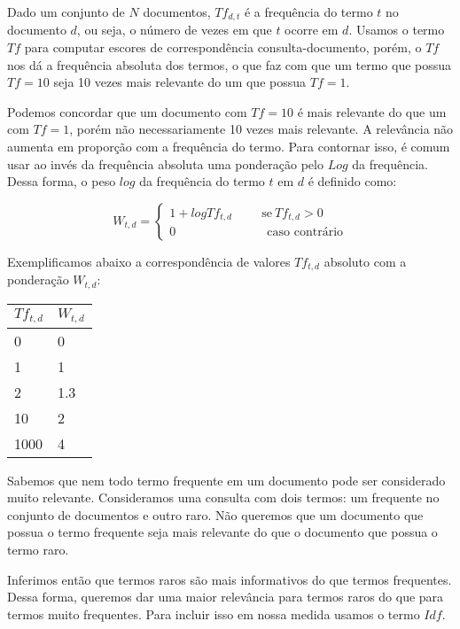 \documentclass[a4paper,12pt]{article}
\begin{document}
  Dado um conjunto de $N$ documentos, $Tf_{d,t}$ é a frequência do termo $t$ no documento
  $d$, ou seja, o número de vezes em que $t$ ocorre em $d$. Usamos o termo $Tf$ para computar escores de correspondência consulta-documento,
  porém, o $Tf$ nos dá a frequência absoluta dos termos, o que faz com que um termo que possua $Tf=10$ seja 10 vezes mais relevante do um que possua
  $Tf=1$. 
  
  Podemos concordar que um documento com $Tf=10$ é mais relevante do que um com $Tf=1$, porém não necessariamente 10 vezes mais relevante.
  A relevância não aumenta em proporção com a frequência do termo. Para contornar isso, é comum usar ao invés da frequência absoluta uma ponderação
  pelo $Log$ da frequência. Dessa forma, o peso $log$ da frequência do termo $t$ em $d$ é definido como:
  
  $$W_{t,d}=\begin{cases}
             1 + logTf_{t,d}  \hspace{1cm} \text{se} \ Tf_{t,d} > 0 \\
             0 \ \hspace{3cm} \text{caso contrário}
            \end{cases}
 $$
 
 
 Exemplificamos abaixo a correspondência de valores $Tf_{t,d}$ absoluto com a ponderação $W_{t,d}$:
 
 \begin{center}
  \begin{tabular}{ll}
    \hline
    $Tf_{t,d}$ & $W_{t,d}$\\
    \hline
    0&0\\
    1&1\\
    2&1.3\\
    10&2\\
    1000&4\\
    
  \end{tabular}
 \end{center}
 
 
  Sabemos que nem todo termo frequente em um documento pode ser considerado muito relevante. Consideramos uma consulta com dois termos:
  um frequente no conjunto de documentos e outro raro. Não queremos que um documento que possua o termo frequente seja mais relevante do que o
  documento que possua o termo raro.

  Inferimos então que termos raros são mais informativos do que termos frequentes. Dessa forma, queremos dar uma maior relevância para
  termos raros do que para termos muito frequentes. Para incluir isso em nossa medida usamos o termo $Idf$.
  
\end{document}
